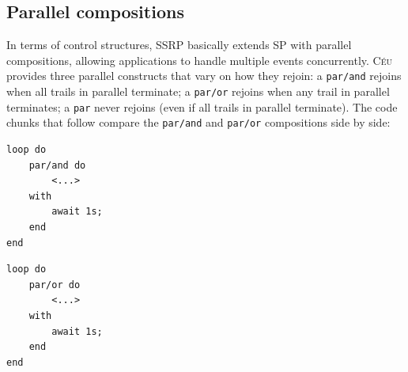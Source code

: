 \documentclass[preprint]{sigplanconf}
\newcommand{\CEU}{\textsc{C\'{e}u}\xspace}
\newcommand{\code}[1] {{\small{\texttt{#1}}}}
\newcommand{\1}{\;}
\newcommand{\2}{\;\;}
\newcommand{\3}{\;\;\;}
\newcommand{\5}{\;\;\;\;\;}
\begin{document}

%



\subsection{Parallel compositions}
\label{sec.ceu.par}

In terms of control structures, SSRP basically extends SP with parallel 
compositions, allowing applications to handle multiple events concurrently.
%
\CEU provides three parallel constructs that vary on how they rejoin:
a \code{par/and} rejoins when all trails in parallel terminate;
a \code{par/or} rejoins when any trail in parallel terminates;
a \code{par} never rejoins (even if all trails in parallel terminate).
%
The code chunks that follow compare the \code{par/and} and \code{par/or} 
compositions side by side:

\begin{minipage}[t]{0.40\linewidth}
\begin{lstlisting}
loop do
    par/and do
        <...>
    with
        await 1s;
    end
end
\end{lstlisting}
\end{minipage}
%
\begin{minipage}[t]{0.40\linewidth}
\begin{lstlisting}
loop do
    par/or do
        <...>
    with
        await 1s;
    end
end
\end{lstlisting}
\end{minipage}
\end{document}
